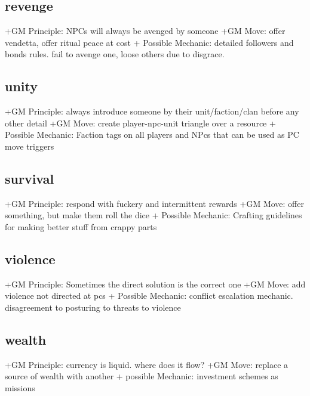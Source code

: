 \documentclass{tufte-handout}
\begin{document}
\subsection{revenge}

+GM Principle: NPCs will always be avenged by someone
+GM Move:  offer vendetta, offer ritual peace at cost
+ Possible Mechanic: detailed followers and bonds rules. fail to avenge one, loose others due to disgrace.

\subsection{unity}
+GM Principle: always introduce someone by their unit/faction/clan before any other detail	
+GM Move: create player-npc-unit triangle over a resource 	
+ Possible Mechanic: Faction tags on all players and NPcs that can be used as PC move triggers


\subsection{survival}
+GM Principle: respond with fuckery and intermittent rewards
+GM Move:  offer something, but make them roll the dice
+ Possible Mechanic: Crafting guidelines for making better stuff from crappy parts

\subsection{violence}
+GM Principle: Sometimes the direct solution is the correct one
+GM Move: 	add violence not directed at pcs
+ Possible Mechanic: conflict escalation mechanic. disagreement to posturing to threats to violence 

\subsection{wealth}
+GM Principle: currency is liquid. where does it flow?
+GM Move: replace a source of wealth with another	
+ possible Mechanic: investment schemes as missions 







\end{document}
